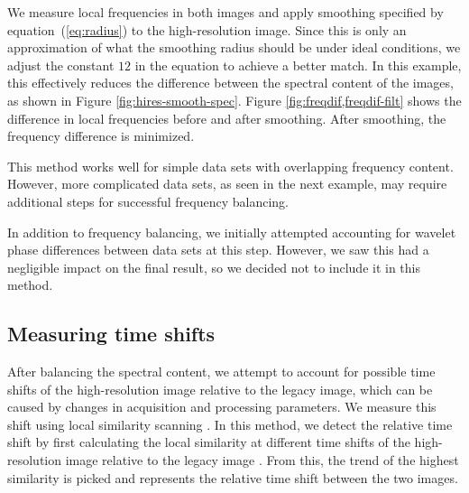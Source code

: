 
We measure local frequencies in both images and apply smoothing specified by equation~(\ref{eq:radius}) to the high-resolution image.
Since this is only an approximation of what the smoothing radius should be under ideal conditions, we adjust the constant $12$ in the equation to achieve a better match.
In this example, this effectively reduces the difference between the spectral content of the images, as shown in Figure \ref{fig:hires-smooth-spec}.
Figure \ref{fig:freqdif,freqdif-filt} shows the difference in local frequencies before and after smoothing. After smoothing, the frequency difference is minimized.

This method works well for simple data sets with overlapping frequency content. However, more complicated data sets, as seen in the next example, may require additional steps for successful frequency balancing.

In addition to frequency balancing, we initially attempted accounting for wavelet phase differences between data sets at this step.
However, we saw this had a negligible impact on the final result, so we decided not to include it in this method.


\subsection{Measuring time shifts}

After balancing the spectral content, we attempt to account for possible time shifts of the high-resolution image relative to the legacy image, which can be caused by changes in acquisition and processing parameters.
We measure this shift using local similarity scanning \cite[]{attr, timelapse}.
In this method, we detect the relative time shift by first calculating the local similarity at different time shifts of the high-resolution image relative to the legacy image \cite[]{timelapse}.
From this, the trend of the highest similarity is picked and represents the relative time shift between the two images.

